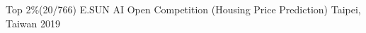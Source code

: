 




\begin{cvhonors}


\cvhonor
{Top 2\%(20/766)} %
{E.SUN AI Open Competition (Housing Price Prediction)} %
{Taipei, Taiwan} %
{2019} %





\end{cvhonors}